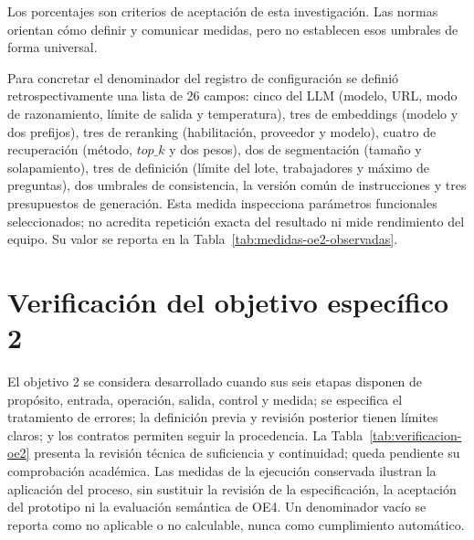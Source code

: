 Los porcentajes son criterios de aceptación de esta investigación. Las normas orientan cómo definir y comunicar medidas, pero no establecen esos umbrales de forma universal.

Para concretar el denominador del registro de configuración se definió retrospectivamente una lista de 26 campos: cinco del LLM (modelo, URL, modo de razonamiento, límite de salida y temperatura), tres de embeddings (modelo y dos prefijos), tres de reranking (habilitación, proveedor y modelo), cuatro de recuperación (método, \(top\_k\) y dos pesos), dos de segmentación (tamaño y solapamiento), tres de definición (límite del lote, trabajadores y máximo de preguntas), dos umbrales de consistencia, la versión común de instrucciones y tres presupuestos de generación. Esta medida inspecciona parámetros funcionales seleccionados; no acredita repetición exacta del resultado ni mide rendimiento del equipo. Su valor se reporta en la Tabla~\ref{tab:medidas-oe2-observadas}.

\section{Verificación del objetivo específico 2}

El objetivo 2 se considera desarrollado cuando sus seis etapas disponen de propósito, entrada, operación, salida, control y medida; se especifica el tratamiento de errores; la definición previa y revisión posterior tienen límites claros; y los contratos permiten seguir la procedencia. La Tabla~\ref{tab:verificacion-oe2} presenta la revisión técnica de suficiencia y continuidad; queda pendiente su comprobación académica. Las medidas de la ejecución conservada ilustran la aplicación del proceso, sin sustituir la revisión de la especificación, la aceptación del prototipo ni la evaluación semántica de OE4. Un denominador vacío se reporta como no aplicable o no calculable, nunca como cumplimiento automático.
